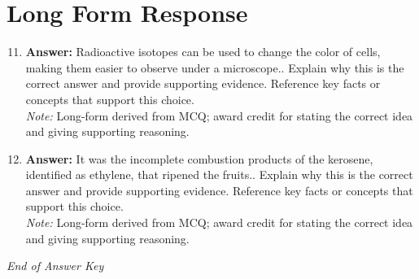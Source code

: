 \documentclass[12pt]{article}
\begin{document}
\section*{Long Form Response}
\begin{enumerate}[label=\arabic*.]
\setcounter{enumi}{10}
\item \textbf{Answer:} Radioactive isotopes can be used to change the color of cells, making them easier to observe under a microscope.. Explain why this is the correct answer and provide supporting evidence. Reference key facts or concepts that support this choice.
\\ \textit{Note:} Long-form derived from MCQ; award credit for stating the correct idea and giving supporting reasoning.
\item \textbf{Answer:} It was the incomplete combustion products of the kerosene, identified as ethylene, that ripened the fruits.. Explain why this is the correct answer and provide supporting evidence. Reference key facts or concepts that support this choice.
\\ \textit{Note:} Long-form derived from MCQ; award credit for stating the correct idea and giving supporting reasoning.
\end{enumerate}

\vfill
\noindent\textit{End of Answer Key}
\end{document}

